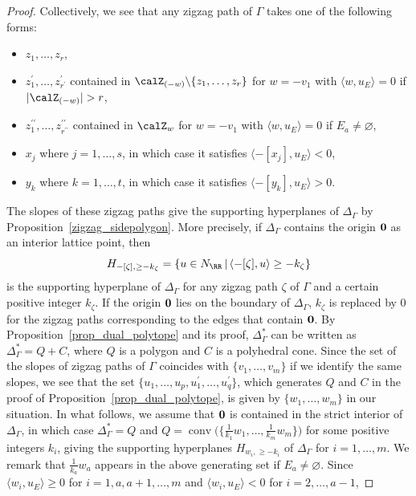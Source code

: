 \begin{proof}
Collectively, we see that any zigzag path of $\Gamma$ takes one of the following forms:
\begin{itemize}\itemsep=0pt
\item $z_1,\dots,z_r$,
\item $z_1^\prime,\dots,z_{r^\prime}^\prime$ contained in $\calZ_{(-w)}{\setminus}\{z_1,\dots,z_r\}$ for $w=-v_1$ with $\langle w,u_E\rangle=0$ if $|\calZ_{(-w)}|>r$,
\item $z_1^{\prime\prime},\dots,z_{r^{\prime\prime}}^{\prime\prime}$ contained in $\calZ_w$ for $w=-v_1$ with $\langle w,u_E\rangle=0$ if $E_a\neq\varnothing$,
\item $x_j$ where $j=1,\dots,s$, in which case it satisfies $\langle-[x_j],u_E\rangle<0$,
\item $y_k$ where $k=1,\dots,t$, in which case it satisfies $\langle-[y_k],u_E\rangle>0$.
\end{itemize}
The slopes of these zigzag paths give the supporting hyperplanes of $\Delta_\Gamma$ by Proposition~\ref{zigzag_sidepolygon}. More precisely, if $\Delta_\Gamma$ contains the origin ${\bf 0}$ as an interior lattice point, then
\begin{displaymath}
H_{-[\zeta],\ge -k_\zeta}=\{u\in N_\RR\,|\,\langle-[\zeta],u\rangle\ge -k_\zeta\}
\end{displaymath}
is the supporting hyperplane of $\Delta_\Gamma$ for any zigzag path $\zeta$ of $\Gamma$ and a certain positive integer $k_\zeta$.
If the origin ${\bf 0}$ lies on the boundary of $\Delta_\Gamma$, $k_\zeta$ is replaced by $0$ for the zigzag paths corresponding to the edges that contain ${\bf 0}$.
By Proposition~\ref{prop_dual_polytope} and its proof, $\Delta_\Gamma^*$ can be written as $\Delta_\Gamma^*=Q+C$, where $Q$ is a polygon and $C$ is a polyhedral cone.
Since the set of the slopes of zigzag paths of $\Gamma$ coincides with $\{v_1,\dots,v_m\}$ if we identify the same slopes,
we see that the set $\{u_1,\dots,u_p,u_1^\prime,\dots,u_q^\prime\}$, which generates $Q$ and $C$ in the proof of Proposition~\ref{prop_dual_polytope},
is given by $\{w_1,\dots,w_m\}$ in our situation.
In what follows, we assume that ${\bf 0}$ is contained in the strict interior of $\Delta_\Gamma$, in which case $\Delta_\Gamma^*=Q$ and
$Q=\operatorname{conv}\big(\big\{\frac{1}{k_1}w_1,\dots,\frac{1}{k_m}w_m\big\}\big)$ for some positive integers $k_i$,
giving the supporting hyperplanes $H_{w_i,\ge-k_i}$ of $\Delta_\Gamma$ for $i=1,\dots,m$.
We remark that $\frac{1}{k_a}w_a$ appears in the above generating set if $E_a\neq\varnothing$.
Since $\langle w_i,u_E\rangle\ge0$ for $i=1,a, a+1,\dots, m$ and $\langle w_i,u_E\rangle<0$ for $i=2,\dots, a-1$,

\end{proof}
